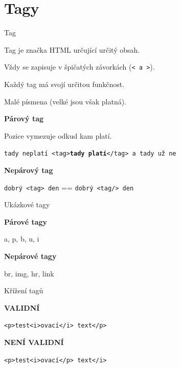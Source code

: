 \documentclass[aspectratio=1610]{beamer}
\begin{document}
\section{Tagy}
\begin{frame}{Tag}
    \begin{cardTiny}
        Tag je značka HTML určující určitý obsah.

        Vždy se zapisuje v špičatých závorkách (\texttt{< a >}).

        Každý tag má svojí určitou funkčnost.

        Malé písmena (velké jsou však platná).
    \end{cardTiny}
    \begin{cardTiny}
        \begin{center}
        \textbf{Párový tag}

        Pozice vymezuje odkud kam platí.

        \texttt{tady neplatí <tag>\textbf{tady platí}</tag> a tady už ne}
        \end{center}
    \end{cardTiny}
    \begin{cardTiny}
        \begin{center}
        \textbf{Nepárový tag}

        \texttt{dobrý <tag> den} == \texttt{dobrý <tag/> den}
        \end{center}
    \end{cardTiny}
\end{frame}

\begin{frame}{Ukázkové tagy}
    \begin{cardTiny}
        \begin{center}
        \textbf{Párové tagy}

        a, p, b, u, i
        \end{center}
    \end{cardTiny}
    \begin{cardTiny}
        \begin{center}
        \textbf{Nepárové tagy}

        br, img, hr, link
        \end{center}
    \end{cardTiny}
\end{frame}

\begin{frame}{Křížení tagů}
    \begin{cardTiny}
        \begin{center}
        \textbf{VALIDNÍ}

        \texttt{<p>test<i>ovací</i> text</p>}
        \end{center}
    \end{cardTiny}
    \begin{cardTiny}
        \begin{center}
        \textbf{NENÍ VALIDNÍ}

        \texttt{<p>test<i>ovací</p> text</i>}
        \end{center}
    \end{cardTiny}
\end{frame}
\end{document}
